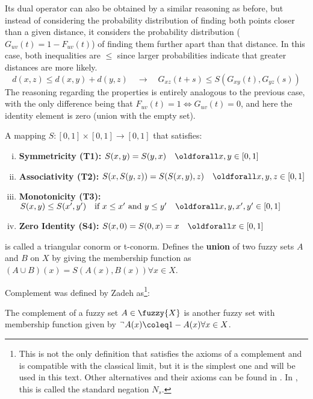 Its dual operator can also be obtained by a similar reasoning as before, but instead of considering the probability distribution of finding both points closer than a given distance, it considers the probability distribution ($G_{uv}(t) = 1 - F_{uv}(t)$) of finding them further apart than that distance. In this case, both inequalities are $\leq$ since larger probabilities indicate that greater distances are more likely.
\begin{equation}\label{eq:Gtriangle_inequality_user}
d(x, z) \leq d(x, y) + d(y, z) \quad \longrightarrow \quad G_{xz}(t + s) \leq S(G_{xy}(t), G_{yz}(s))
\end{equation}
The reasoning regarding the properties is entirely analogous to the previous case, with the only difference being that $F_{uv}(t) = 1 \Leftrightarrow  G_{uv}(t) = 0$, and here the identity element is zero (union with the empty set).
\begin{definition}
  A mapping $S:[0,1]\times [0,1] \longrightarrow [0,1]$ that satisfies:
  \begin{enumerate}[(i)]\setlength{\itemindent}{2em}
    \item \textbf{Symmetricity (T1):} $S(x,y) = S(y,x) \quad \oldforall x,y \in [0,1]$
    \item \textbf{Associativity (T2):} $S(x,S(y,z)) = S(S(x,y),z) \quad \oldforall x,y,z \in [0,1]$
    \item \textbf{Monotonicity (T3):} $S(x,y) \leq S(x',y') \quad \textnormal{if }x\leq x' \textnormal{ and } y\leq y' \quad \oldforall x,y,x',y' \in [0,1]$
    \item \textbf{Zero Identity (S4):} $S(x,0) = S(0,x) = x \quad \oldforall x \in [0,1]$
  \end{enumerate}
  is called a triangular conorm or t-conorm. Defines the \textbf{union} of two fuzzy sets $A$ and $B$ on $X$ by giving the membership function as $(A \cup  B) (x) = S(A(x),B(x)) \forall x \in X$.
\end{definition}
Complement was defined by Zadeh \cite{Zadeh1965} as\footnote{This is not the only definition that satisfies the axioms of a complement and is compatible with the classical limit, but it is the simplest one and will be used in this text. Other alternatives and their axioms can be found in \cite{Sladoje2007}. In \cite{Klement2000}, this is called the standard negation $N_s$.}:
\begin{definition}[Complement]
  The complement of a fuzzy set $A\in \fuzzy{X}$ is another fuzzy set with membership function given by $^\lnot A(x) \coleq 1 - A(x) \forall x\in X$.
\end{definition}
